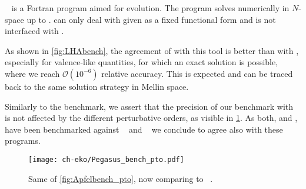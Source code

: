 \pegasus{}~\cite{Vogt:2004ns} is a Fortran program aimed for \pdf{} evolution.
The program solves \dglap{} numerically in $N$-space up to \nnlo{}.
\pegasus{} can only deal with \pdfs given as a fixed functional form and is
not interfaced with \lhapdf{}.

As shown in \cref{fig:LHAbench}, the agreement of \eko{} with this tool is better than with \apfel{},
especially for valence-like quantities, for which an exact solution is possible, where we reach
$\mathcal{O}(10^{-6})$ relative accuracy.
This is expected and can be traced back to the same \dglap{} solution strategy in Mellin space.

Similarly to the \apfel{} benchmark, we assert that the precision of our benchmark with \pegasus{} is not affected
by the different \qcd{} perturbative orders, as visible in \cref{fig:Pegasusbench_pto}.
As both, \apfel{} and \pegasus{}, have been benchmarked against
\hoppet{}~\cite{Salam:2008qg} and \qcdnum{}~\cite{Botje:2010ay} we conclude
to agree also with these programs.

\begin{figure}
    \texttt{[image: ch-eko/Pegasus\_bench\_pto.pdf]}
    \caption{Same of \cref{fig:Apfelbench_pto}, now comparing to \pegasus{}~\cite{Vogt:2004ns}.
        \label{fig:Pegasusbench_pto} }
\end{figure}
